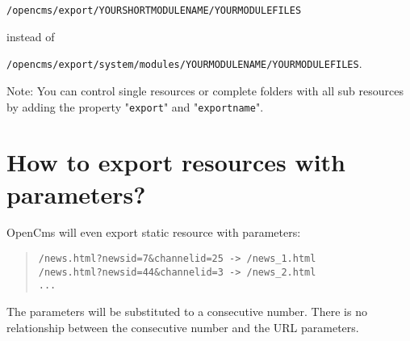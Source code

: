 \texttt{/opencms/export/YOURSHORTMODULENAME/YOURMODULEFILES}

instead of

\texttt{/opencms/export/system/modules/YOURMODULENAME/YOURMODULEFILES}.

Note: You can control single resources or complete folders with all sub resources by adding the property "\texttt{export}" and "\texttt{exportname}".

\section{How to export resources with parameters?}

OpenCms will even export static resource with parameters:

\begin{quote}
\begin{verbatim}
/news.html?newsid=7&channelid=25 -> /news_1.html
/news.html?newsid=44&channelid=3 -> /news_2.html
...
\end{verbatim}
\end{quote}

The parameters will be substituted to a consecutive number. There is no relationship between the consecutive number and the URL parameters.
